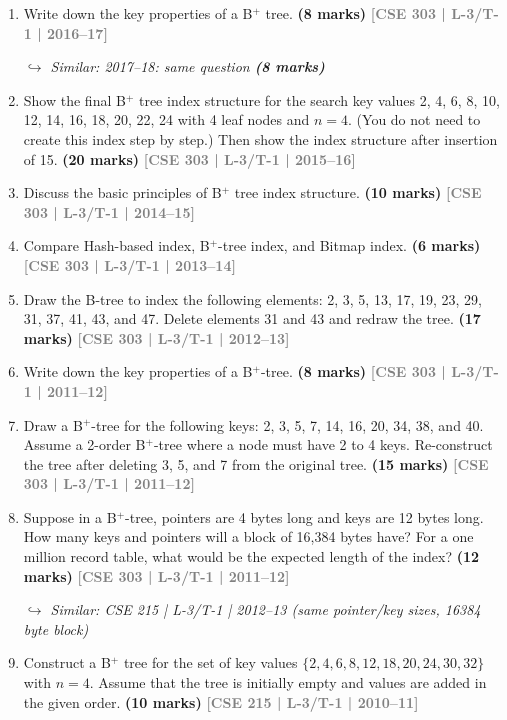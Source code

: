 \documentclass[12pt,a3paper]{article}
\newcommand{\yr}[1]{\hfill\textcolor{gray}{\small\textbf{[#1]}}}
\newcommand{\mk}[1]{\textcolor{orange!70!black}{\small\textbf{(#1 marks)}}}
\newcommand{\variant}[1]{\par\vspace{1pt}\textcolor{blue!50!black}%
  {\footnotesize\textit{$\hookrightarrow$ Similar: #1}}}
\begin{document}
\begin{enumerate}
\mk{8} \yr{CSE 303 | L-3/T-1 | 2016--17}

\item Write down the key properties of a B$^+$ tree.
\mk{8} \yr{CSE 303 | L-3/T-1 | 2016--17}

\variant{2017--18: same question \mk{8}}

\item Show the final B$^+$ tree index structure for the search key values 2, 4, 6, 8, 10, 12, 14, 16, 18, 20, 22, 24 with 4 leaf nodes and $n = 4$. (You do not need to create this index step by step.) Then show the index structure after insertion of 15.
\mk{20} \yr{CSE 303 | L-3/T-1 | 2015--16}

\item Discuss the basic principles of B$^+$ tree index structure.
\mk{10} \yr{CSE 303 | L-3/T-1 | 2014--15}

\item Compare Hash-based index, B$^+$-tree index, and Bitmap index.
\mk{6} \yr{CSE 303 | L-3/T-1 | 2013--14}

\item Draw the B-tree to index the following elements: 2, 3, 5, 13, 17, 19, 23, 29, 31, 37, 41, 43, and 47. Delete elements 31 and 43 and redraw the tree.
\mk{17} \yr{CSE 303 | L-3/T-1 | 2012--13}

\item Write down the key properties of a B$^+$-tree.
\mk{8} \yr{CSE 303 | L-3/T-1 | 2011--12}

\item Draw a B$^+$-tree for the following keys: 2, 3, 5, 7, 14, 16, 20, 34, 38, and 40. Assume a 2-order B$^+$-tree where a node must have 2 to 4 keys. Re-construct the tree after deleting 3, 5, and 7 from the original tree.
\mk{15} \yr{CSE 303 | L-3/T-1 | 2011--12}

\item Suppose in a B$^+$-tree, pointers are 4 bytes long and keys are 12 bytes long. How many keys and pointers will a block of 16,384 bytes have? For a one million record table, what would be the expected length of the index?
\mk{12} \yr{CSE 303 | L-3/T-1 | 2011--12}

\variant{CSE 215 | L-3/T-1 | 2012--13 (same pointer/key sizes, 16384 byte block)}

\item Construct a B$^+$ tree for the set of key values $\{2, 4, 6, 8, 12, 18, 20, 24, 30, 32\}$ with $n = 4$. Assume that the tree is initially empty and values are added in the given order.
\mk{10} \yr{CSE 215 | L-3/T-1 | 2010--11}

\end{enumerate}
\end{document}
